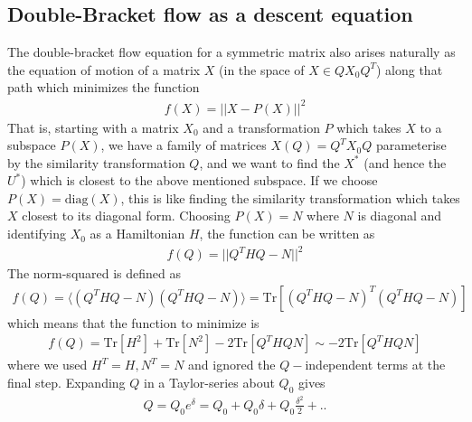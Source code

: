 \documentclass[12pt,twoside]{article}
\numberwithin{equation}{section}
\begin{document}
{\subsection{Double-Bracket flow as a descent equation}
The double-bracket flow equation for a symmetric matrix also arises naturally as the equation of motion of a matrix \(X\) (in the space of \(X \in Q X_0 Q^T\)) along that path which minimizes the function
\begin{equation}\begin{aligned}
	f(X) =  ||X - P(X)||^2
\end{aligned}\end{equation}
That is, starting with a matrix \(X_0\) and a transformation \(P\) which takes \(X\) to a subspace \( {P(X)}\), we have a family of matrices \(X(Q) = Q^T X_0 Q\) parameterise by the similarity transformation \(Q\), and we want to find the \(X^*\) (and hence the \(U^*\)) which is closest to the above mentioned subspace. If we choose \(P(X) = \text{diag}(X)\), this is like finding the similarity transformation which takes \(X\) closest to its diagonal form. 
\pb Choosing \(P(X) = N\) where \(N\) is diagonal and identifying \(X_0\) as a Hamiltonian \(H\), the function can be written as
\begin{equation}\begin{aligned}
	f(Q) = ||Q^T H Q - N ||^2
\end{aligned}\end{equation}
The norm-squared is defined as
\begin{equation}\begin{aligned}
	f(Q) = \langle \left(Q^T H Q - N\right) \left(Q^T H Q - N\right)\rangle = \text{Tr}\left[\left(Q^T H Q - N\right)^T \left(Q^T H Q - N\right)\right]
\end{aligned}\end{equation}
which means that the function to minimize is
\begin{equation}\begin{aligned}
	f(Q) = \text{Tr}\left[ H^2 \right] + \text{Tr}\left[ N^2 \right] - 2\text{Tr}\left[ Q^THQN \right] \sim - 2\text{Tr}\left[ Q^THQN \right]
\end{aligned}\end{equation}
where we used \(H^T = H, N^T = N\) and ignored the \(Q-\)independent terms at the final step. Expanding \(Q\) in a Taylor-series about \(Q_0\) gives
\begin{equation}\begin{aligned}
	Q = Q_0 e^\delta = Q_0 + Q_0 \delta + Q_0 \frac{\delta^2}{2} + ..

\end{aligned}
\end{equation}}
\end{document}
